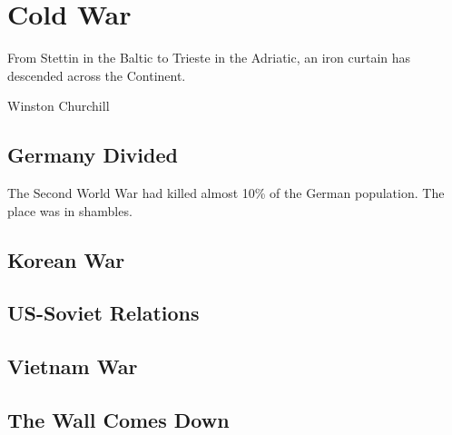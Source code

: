 \chapter{Cold War}

\epigraph{%
  From Stettin in the Baltic to Trieste in the Adriatic, an iron curtain has descended across the Continent.
}{Winston Churchill}

\section{Germany Divided}

The Second World War had killed almost 10\% of the German population.
The place was in shambles.

\section{Korean War}

\section{US-Soviet Relations}

\section{Vietnam War}

\section{The Wall Comes Down}
